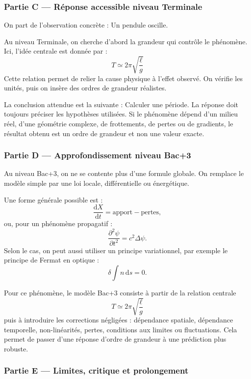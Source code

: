 \documentclass[11pt,a4paper]{article}
\begin{document}
\subsubsection*{Partie C — Réponse accessible niveau Terminale}

\begin{corrigebox}
On part de l'observation concrète : Un pendule oscille.

Au niveau Terminale, on cherche d'abord la grandeur qui contrôle le phénomène. Ici, l'idée centrale est donnée par :
\[
T\simeq2\pi\sqrt{\frac{\ell}{g}}
\]
Cette relation permet de relier la cause physique à l'effet observé. On vérifie les unités, puis on insère des ordres de grandeur réalistes.

La conclusion attendue est la suivante : Calculer une période. La réponse doit toujours préciser les hypothèses utilisées. Si le phénomène dépend d'un milieu réel, d'une géométrie complexe, de frottements, de pertes ou de gradients, le résultat obtenu est un ordre de grandeur et non une valeur exacte.
\end{corrigebox}

\subsubsection*{Partie D — Approfondissement niveau Bac+3}

\begin{approfondissementbox}
Au niveau Bac+3, on ne se contente plus d'une formule globale. On remplace le modèle simple par une loi locale, différentielle ou énergétique.

Une forme générale possible est :
\[
\frac{\mathrm d X}{\mathrm dt}=\text{apport}-\text{pertes},
\]
ou, pour un phénomène propagatif :
\[
\frac{\partial^2 \psi}{\partial t^2}=c^2\Delta\psi.
\]
Selon le cas, on peut aussi utiliser un principe variationnel, par exemple le principe de Fermat en optique :
\[
\delta \int n\,\mathrm ds=0.
\]

Pour ce phénomène, le modèle Bac+3 consiste à partir de la relation centrale
\[
T\simeq2\pi\sqrt{\frac{\ell}{g}}
\]
puis à introduire les corrections négligées : dépendance spatiale, dépendance temporelle, non-linéarités, pertes, conditions aux limites ou fluctuations. Cela permet de passer d'une réponse d'ordre de grandeur à une prédiction plus robuste.
\end{approfondissementbox}

\subsubsection*{Partie E — Limites, critique et prolongement}
\end{document}
